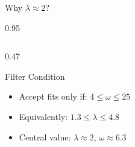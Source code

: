 \documentclass[9pt, aspectratio=169, t]{beamer}
\begin{document}
\begin{frame}{Why $\lambda \approx 2$?}
\begin{cminipage}{0.95\textwidth}
{\begin{columns}[T]
\begin{column}{0.47\textwidth}
            \begin{block}{Filter Condition}
                \begin{itemize}\setlength{\itemsep}{0pt}
                    \item Accept fits only if: $4 \leq \omega \leq 25$
                    \item Equivalently: $1.3 \leq \lambda \leq 4.8$
                    \item Central value: $\lambda \approx 2$, $\omega \approx 6.3$
                \end{itemize}
            \end{block}
        \end{column}
    \end{columns}
    }
    \end{cminipage}
\end{frame}
\end{document}
